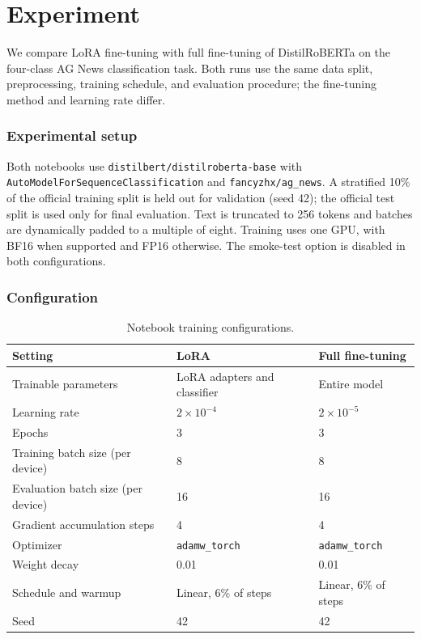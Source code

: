 \section{Experiment}
We compare LoRA fine-tuning with full fine-tuning of DistilRoBERTa on the four-class AG News classification task. Both runs use the same data split, preprocessing, training schedule, and evaluation procedure; the fine-tuning method and learning rate differ.

\subsubsection{Experimental setup}
Both notebooks use \texttt{distilbert/distilroberta-base} with \texttt{AutoModelForSequenceClassification} and \texttt{fancyzhx/ag\_news}. A stratified 10\% of the official training split is held out for validation (seed 42); the official test split is used only for final evaluation. Text is truncated to 256 tokens and batches are dynamically padded to a multiple of eight. Training uses one GPU, with BF16 when supported and FP16 otherwise. The smoke-test option is disabled in both configurations.

\subsubsection{Configuration}
\begin{table}[htbp]
\centering
\caption{Notebook training configurations.}
\label{tab:setup}
\begin{tabular}{lll}
\hline
\textbf{Setting} & \textbf{LoRA} & \textbf{Full fine-tuning} \\
\hline
Trainable parameters & LoRA adapters and classifier & Entire model \\
Learning rate & $2\times10^{-4}$ & $2\times10^{-5}$ \\
Epochs & 3 & 3 \\
Training batch size (per device) & 8 & 8 \\
Evaluation batch size (per device) & 16 & 16 \\
Gradient accumulation steps & 4 & 4 \\
Optimizer & \texttt{adamw\_torch} & \texttt{adamw\_torch} \\
Weight decay & 0.01 & 0.01 \\
Schedule and warmup & Linear, 6\% of steps & Linear, 6\% of steps \\
Seed & 42 & 42 \\
\hline
\end{tabular}
\end{table}

